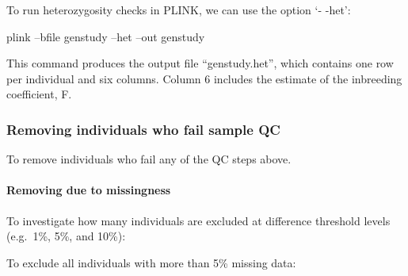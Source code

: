 \documentclass[]{book}
\newenvironment{Shaded}{\begin{snugshade}}{\end{snugshade}}
\newcommand{\KeywordTok}[1]{\textcolor[rgb]{0.13,0.29,0.53}{\textbf{#1}}}
\newcommand{\StringTok}[1]{\textcolor[rgb]{0.31,0.60,0.02}{#1}}
\newcommand{\FunctionTok}[1]{\textcolor[rgb]{0.00,0.00,0.00}{#1}}
\newcommand{\OperatorTok}[1]{\textcolor[rgb]{0.81,0.36,0.00}{\textbf{#1}}}
\newcommand{\ExtensionTok}[1]{#1}
\newcommand{\NormalTok}[1]{#1}
\let\oldparagraph\paragraph
\renewcommand{\paragraph}[1]{\oldparagraph{#1}\mbox{}}
\begin{document}
To run heterozygosity checks in PLINK, we can use the option `- -het':

\begin{Shaded}
\begin{Highlighting}[]
\ExtensionTok{plink}\NormalTok{ --bfile genstudy --het --out genstudy}
\end{Highlighting}
\end{Shaded}

This command produces the output file ``genstudy.het'', which contains
one row per individual and six columns. Column 6 includes the estimate
of the inbreeding coefficient, F.

\subsubsection{Removing individuals who fail sample
QC}\label{removing-individuals-who-fail-sample-qc}

To remove individuals who fail any of the QC steps above.

\paragraph{Removing due to
missingness}\label{removing-due-to-missingness}

To investigate how many individuals are excluded at difference threshold
levels (e.g.~1\%, 5\%, and 10\%):

\begin{Shaded}
\end{Shaded}

To exclude all individuals with more than 5\% missing data:

\begin{Shaded}
\end{Shaded}
\end{document}
